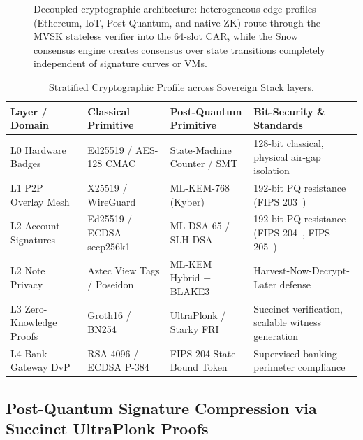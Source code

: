 \documentclass[a4paper,11pt,twoside,parskip=half-,headings=small]{scrartcl}
\begin{document}
\begin{figure}[H]
{%
}
\caption{Decoupled cryptographic architecture: heterogeneous edge profiles (Ethereum, IoT, Post-Quantum, and native ZK) route through the MVSK stateless verifier into the 64-slot CAR, while the Snow consensus engine creates consensus over state transitions completely independent of signature curves or VMs.}
\label{fig:polymorphic_crypto_architecture}
\end{figure}

\begin{table}[H]
\centering\small
\renewcommand{\arraystretch}{1.2}
\begin{tabularx}{\linewidth}{@{}l L{3.2cm} L{3.2cm} Y@{}}
\toprule
\textbf{Layer / Domain} & \textbf{Classical Primitive} & \textbf{Post-Quantum Primitive} & \textbf{Bit-Security \& Standards}\\
\midrule
L0 Hardware Badges & Ed25519 / AES-128 CMAC & State-Machine Counter / SMT & 128-bit classical, physical air-gap isolation\\
L1 P2P Overlay Mesh & X25519 / WireGuard & ML-KEM-768 (Kyber) & 192-bit PQ resistance (FIPS 203~\cite{fips203})\\
L2 Account Signatures & Ed25519 / ECDSA secp256k1 & ML-DSA-65 / SLH-DSA & 192-bit PQ resistance (FIPS 204~\cite{fips204}, FIPS 205~\cite{fips205})\\
L2 Note Privacy & Aztec View Tags / Poseidon & ML-KEM Hybrid + BLAKE3 & Harvest-Now-Decrypt-Later defense\\
L3 Zero-Knowledge Proofs & Groth16 / BN254 & UltraPlonk / Starky FRI & Succinct verification, scalable witness generation\\
L4 Bank Gateway DvP & RSA-4096 / ECDSA P-384 & FIPS 204 State-Bound Token & Supervised banking perimeter compliance\\
\bottomrule
\end{tabularx}
\caption{Stratified Cryptographic Profile across Sovereign Stack layers.}
\label{tab:crypto_profiles}
\end{table}

\subsection{Post-Quantum Signature Compression via Succinct UltraPlonk Proofs}
\label{sec:pq_compression}
\end{document}
